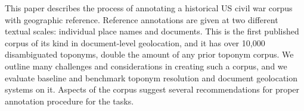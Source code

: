 This paper describes the process of annotating a historical US civil war corpus with geographic reference. Reference annotations are given at two different textual scales: individual place names and documents. This is the first published corpus of its kind in document-level geolocation, and it has over 10,000 disambiguated toponyms, double the amount of any prior toponym corpus. We outline many challenges and considerations in creating such a corpus, and we evaluate baseline and benchmark toponym resolution and document geolocation systems on it. Aspects of the corpus suggest several recommendations for proper annotation procedure for the tasks.
